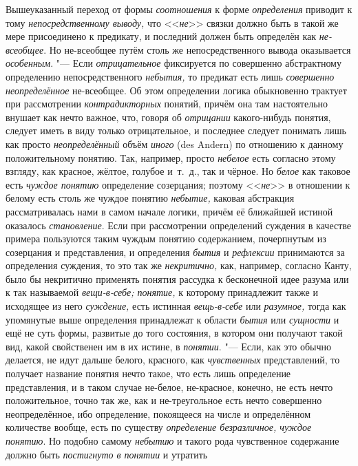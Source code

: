 Вышеуказанный переход от формы {\em соотношения} к форме {\em определения}
приводит к тому {\em непосредственному выводу,} что <<{\em не}>> связки должно
быть в такой же мере присоединено к предикату, и последний должен быть
определён как {\em не-всеобщее}. Но не-всеобщее путём столь же
непосредственного вывода оказывается {\em особенным}. "--- Если
{\em отрицательное} фиксируется по совершенно абстрактному определению
непосредственного {\em небытия,} то предикат есть лишь {\em совершенно
неопределённое} не-всеобщее. Об этом определении логика обыкновенно трактует
при рассмотрении {\em контрадикторных} понятий, причём она там настоятельно
внушает как нечто важное, что, говоря об {\em отрицании} какого-нибудь понятия,
следует иметь в виду только отрицательное, и последнее следует понимать лишь
как просто {\em неопределённый} объём {\em иного} (des Andern) по отношению к
данному положительному понятию. Так, например, просто {\em небелое} есть
согласно этому взгляду, как красное, жёлтое, голубое и~т.~д., так и чёрное.
Но {\em белое} как таковое есть {\em чуждое понятию} определение созерцания;
поэтому <<{\em не}>> в отношении к белому есть столь же чуждое понятию
{\em небытие,} каковая абстракция рассматривалась нами в самом начале логики,
причём её ближайшей истиной оказалось {\em становление}. Если при рассмотрении
определений суждения в качестве примера пользуются таким чуждым понятию
содержанием, почерпнутым из созерцания и представления, и определения
{\em бытия} и {\em рефлексии} принимаются за определения суждения, то это так
же {\em некритично,} как, например, согласно Канту, было бы некритично
применять понятия рассудка к бесконечной идее разума или к так называемой
{\em вещи-в-себе; понятие,} к которому принадлежит также и исходящее из него
{\em суждение,} есть истинная {\em вещь-в-себе} или {\em разумное,} тогда как
упомянутые выше определения принадлежат к области {\em бытия} или
{\em сущности} и ещё не суть формы, развитые до того состояния, в котором они
получают такой вид, какой свойственен им в их истине, в {\em понятии}. "---
Если, как это обычно делается, не идут дальше белого, красного, как
{\em чувственных} представлений, то получает название понятия нечто такое, что
есть лишь определение представления, и в таком случае не-белое, не-красное,
конечно, не есть нечто положительное, точно так же, как и не-треугольное есть
нечто совершенно неопределённое, ибо определение, покоящееся на числе и
определённом количестве вообще, есть по существу {\em определение
безразличное, чуждое понятию}. Но подобно самому {\em небытию} и такого
рода чувственное содержание должно быть {\em постигнуто в понятии} и утратить
